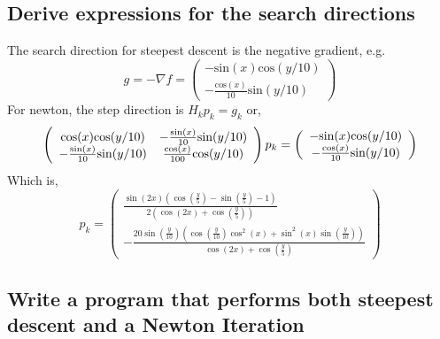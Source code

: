 \documentclass{article}
\begin{document}
\newpage
\subsection{Derive expressions for the search directions}

The search direction for steepest descent is the negative gradient,
e.g. 
\begin{equation*}
g = -\nabla f =\left(
  \begin{array}{ c }
     - \text{sin}(x)\text{cos}(y/10)\\
     - \frac{\text{cos}(x)}{10}\text{sin}(y/10)
  \end{array} \right)
\end{equation*}
For newton, the step direction is $H_k p_k = g_k$ or, 
\begin{equation*}
\left(
  \begin{array}{ c c }
     \text{cos}(x)\text{cos}(y/10) & -\frac{\text{sin}(x)}{10}\text{sin}(y/10) \\
     -\frac{\text{sin}(x)}{10}\text{sin}(y/10) & \frac{\text{cos}(x)}{100}\text{cos}(y/10)
  \end{array} \right)
  p_k  
  = 
\left(
 \begin{array}{ c }
  - \text{sin}(x)\text{cos}(y/10)\\
  - \frac{\text{cos}(x)}{10}\text{sin}(y/10)
   \end{array} \right)
\end{equation*}
Which is, 
\begin{equation*}
 p_k = 
\left(
\begin{array}{c}
 \frac{\sin (2 x) \left(\cos \left(\frac{y}{5}\right)-\sin
   \left(\frac{y}{5}\right)-1\right)}{2 \left(\cos (2 x)+\cos
   \left(\frac{y}{5}\right)\right)} \\
 -\frac{20 \sin \left(\frac{y}{10}\right) \left(\cos
   \left(\frac{y}{10}\right) \cos ^2(x)+\sin ^2(x) \sin
   \left(\frac{y}{10}\right)\right)}{\cos (2 x)+\cos
   \left(\frac{y}{5}\right)}
\end{array}
\right)
\end{equation*}

\subsection{Write a program that performs both steepest descent and a
  Newton Iteration} 
\end{document}
